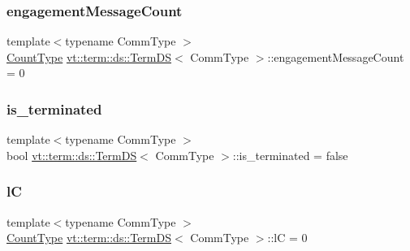 \subsubsection{\texorpdfstring{engagement\+Message\+Count}{engagementMessageCount}}
{\footnotesize\ttfamily template$<$typename Comm\+Type $>$ \\
\hyperlink{structvt_1_1term_1_1ds_1_1_term_d_s_a54f4ebd7e1ecb59c32c0f5b03ef9f20b}{Count\+Type} \hyperlink{structvt_1_1term_1_1ds_1_1_term_d_s}{vt\+::term\+::ds\+::\+Term\+DS}$<$ Comm\+Type $>$\+::engagement\+Message\+Count = 0\hspace{0.3cm}{\ttfamily [protected]}}

\mbox{\label{structvt_1_1term_1_1ds_1_1_term_d_s_af53bdb81804df4d07dc7fd647329a89a}} 
\subsubsection{\texorpdfstring{is\+\_\+terminated}{is\_terminated}}
{\footnotesize\ttfamily template$<$typename Comm\+Type $>$ \\
bool \hyperlink{structvt_1_1term_1_1ds_1_1_term_d_s}{vt\+::term\+::ds\+::\+Term\+DS}$<$ Comm\+Type $>$\+::is\+\_\+terminated = false}

\mbox{\label{structvt_1_1term_1_1ds_1_1_term_d_s_a7b24d9eb35f71de23824ea8434a52cfd}} 
\subsubsection{\texorpdfstring{lC}{lC}}
{\footnotesize\ttfamily template$<$typename Comm\+Type $>$ \\
\hyperlink{structvt_1_1term_1_1ds_1_1_term_d_s_a54f4ebd7e1ecb59c32c0f5b03ef9f20b}{Count\+Type} \hyperlink{structvt_1_1term_1_1ds_1_1_term_d_s}{vt\+::term\+::ds\+::\+Term\+DS}$<$ Comm\+Type $>$\+::lC = 0\hspace{0.3cm}{\ttfamily [protected]}}

\mbox{\label{structvt_1_1term_1_1ds_1_1_term_d_s_acd01a2b3778d0510fe35f6497f33eda9}} 
